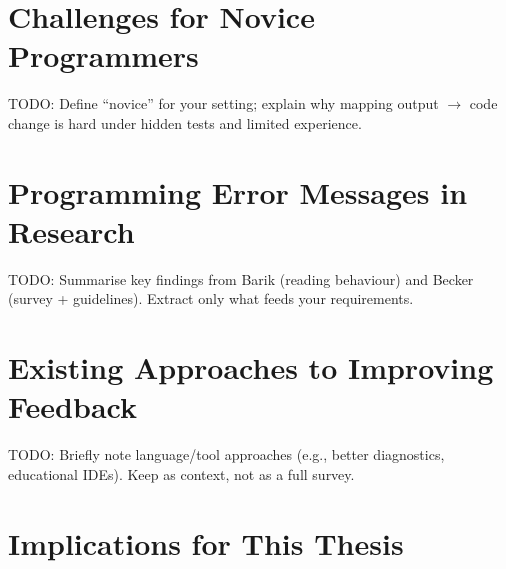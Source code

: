 \documentclass[
	bibliography=totoc,
	listof=totoc,
]{scrbook}
\begin{document}
\section{Challenges for Novice Programmers} %

\begin{marker}\begin{justify}
TODO: Define ``novice'' for your setting; explain why mapping output $\rightarrow$ code change is hard under hidden tests and limited experience.
\end{justify}\end{marker}


\section{Programming Error Messages in Research} %

\begin{marker}\begin{justify}
TODO: Summarise key findings from Barik (reading behaviour) and Becker (survey + guidelines). Extract only what feeds your requirements.
\end{justify}\end{marker}


\section{Existing Approaches to Improving Feedback} %

\begin{marker}\begin{justify}
TODO: Briefly note language/tool approaches (e.g., better diagnostics, educational IDEs). Keep as context, not as a full survey.
\end{justify}\end{marker}


\section{Implications for This Thesis} %
\end{document}
